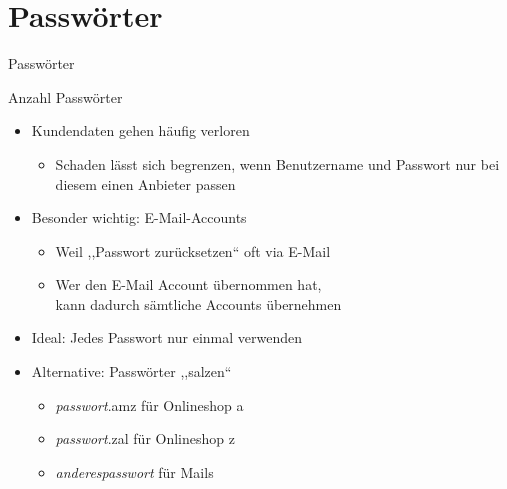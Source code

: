 \section{Passwörter}
\begin{frame}{Passwörter}


\end{frame}

\begin{frame}{Anzahl Passwörter}
  \begin{itemize}
    \item Kundendaten gehen häufig verloren
    \begin{itemize}
      \item Schaden lässt sich begrenzen, wenn Benutzername und Passwort nur bei diesem einen Anbieter passen
    \end{itemize}
    \item Besonder wichtig: E-Mail-Accounts
    \begin{itemize}
      \item Weil ,,Passwort zurücksetzen`` oft via E-Mail
      \item Wer den E-Mail Account übernommen hat,\\ kann dadurch sämtliche Accounts übernehmen
    \end{itemize}
    \item Ideal: Jedes Passwort nur einmal verwenden
    \item Alternative: Passwörter ,,salzen``
    \begin{itemize}
      \item \textit{passwort}.amz für Onlineshop a
      \item \textit{passwort}.zal für Onlineshop z
      \item \textit{anderespasswort} für Mails
    \end{itemize}
  \end{itemize}
\end{frame}


